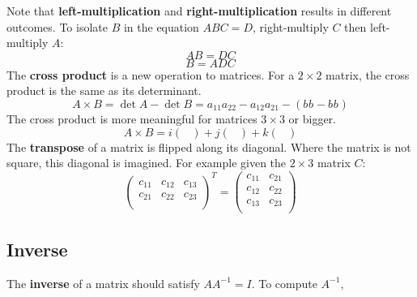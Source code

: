 \documentclass[10pt,a4paper,fleqn]{article} %
\begin{document}
\noindent Note that \textbf{left-multiplication} and \textbf{right-multiplication} results 
in different outcomes.
To isolate $B$ in the equation $ABC=D$, right-multiply $C$ then left-multiply $A$:
\begin{equation*}
    AB = DC
\end{equation*}
\begin{equation*}
    B = ADC
\end{equation*}
The \textbf{cross product} is a new operation to matrices. For a $2\times2$ matrix,
the cross product is the same as its determinant.
\begin{equation}
    A \times B
    =
    \det{A} - \det{B}
    =
    a_{11} a_{22} - a_{12} a_{21} - \left( b_{} b_{} - b_{} b_{} \right)
\end{equation}
The cross product is more meaningful for matrices $3\times3$ or bigger.
\begin{equation}
    A \times B
    =
    i \begin{pmatrix}
        
    \end{pmatrix}
    +
    j \begin{pmatrix}
        
    \end{pmatrix}
    +
    k \begin{pmatrix}
        
    \end{pmatrix}
\end{equation}
The \textbf{transpose} of a matrix is flipped along its diagonal.
Where the matrix is not square, this diagonal is imagined.
For example given the $2\times3$ matrix $C$:
\begin{equation}
    \begin{pmatrix}
        c_{11} & c_{12} & c_{13} \\
        c_{21} & c_{22} & c_{23} \\
    \end{pmatrix}^T
    =
    \begin{pmatrix}
        c_{11} & c_{21} \\
        c_{12} & c_{22} \\
        c_{13} & c_{23} \\
    \end{pmatrix}
\end{equation}

\subsection{Inverse} %
The \textbf{inverse} of a matrix should satisfy $AA^{-1}=I$. To compute $A^{-1}$,
\end{document}
